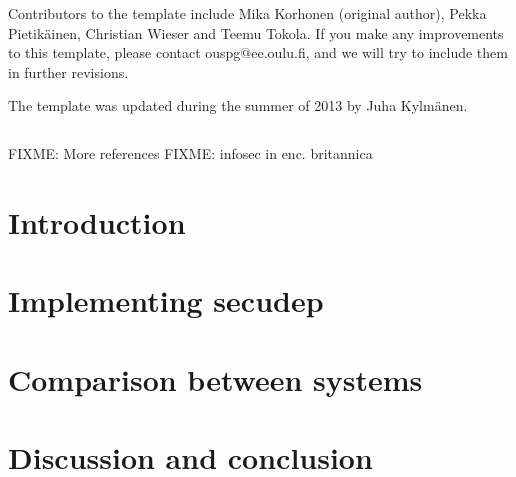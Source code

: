 \documentclass[a4paper,12pt,titlepage]{dithesis}
\begin{document}
Contributors to the template include Mika Korhonen (original author),
Pekka Pietikäinen, Christian Wieser and Teemu Tokola.  If you make any
improvements to this template, please contact ouspg@ee.oulu.fi, and we
will try to include them in further revisions.

The template was updated during the summer of 2013 by Juha Kylmänen.


\setlongtables
\begin{longtable}[l]{p{3cm}p{}}
  
\end{longtable}
\setcounter{table}{0}

FIXME: More references
FIXME: infosec in enc. britannica

\chapter{Introduction}
\sivunumerot{}

\chapter{Implementing secudep}

\chapter{Comparison between systems}

\chapter{Discussion and conclusion}




\end{document}
